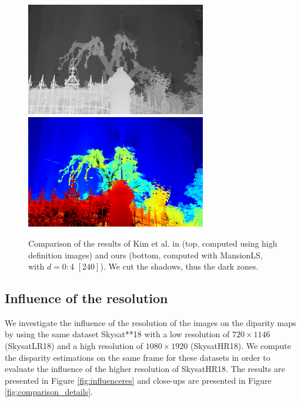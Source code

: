 \documentclass{article}
\theoremstyle{definition}
\begin{document}
\begin{figure}[ht]
 \centering
 \includegraphics[width=0.7\textwidth]{images/mansion_kim_resized.png}\\
 \includegraphics[width=0.7\textwidth]{images/MansionLR_240/1521776307225_dmap_050.png}
 \caption{Comparison of the results of Kim et al. in \cite{art:kim13:lfields} (top, computed using high definition images) and ours (bottom, computed with MansionLS, with $d=0:4$ $[240]$). We cut the shadows, thus the dark zones.}
 \label{fig:comparison_kim}
\end{figure}



\subsection{Influence of the resolution}


We investigate the influence of the resolution of the images on the diparity maps by using the same dataset Skysat**18 with a low resolution of $720\times 1146$ (SkysatLR18) and a high resolution of $1080\times 1920$ (SkysatHR18). We compute the disparity estimations on the same frame for these datasets in order to evaluate the influence of the higher resolution of SkysatHR18. The results are presented in Figure \ref{fig:influenceres} and close-ups are presented in Figure \ref{fig:comparison_details}. 
\end{document}
